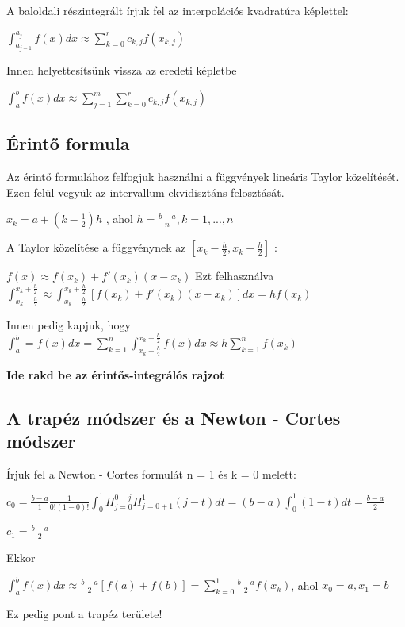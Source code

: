 \documentclass{article}
\theoremstyle{definition}
\begin{document}
A baloldali részintegrált írjuk fel az interpolációs kvadratúra képlettel:
\begin{center}
$\int_{a_{j-1}}^{a_j} f(x) dx \approx \sum_{k=0}^{r} c_{k,j}f(x_{k,j})$
\end{center}

Innen helyettesítsünk vissza az eredeti képletbe
\begin{center}
$\int_a^b f(x) dx \approx \sum_{j=1}^{m} \sum_{k=0}^{r} c_{k,j} f(x_{k,j})$
\end{center}


\subsection{Érintő formula}

Az érintő formulához felfogjuk használni a függvények lineáris Taylor közelítését. Ezen felül vegyük az intervallum ekvidisztáns felosztását.
\begin{center}
   $x_k = a + (k - \frac{1}{2})h$ , ahol $h = \frac{b-a}{n}, k =1,...,n$ 
\end{center}
A Taylor közelítése a függvénynek az $[x_k-\frac{h}{2},x_k+\frac{h}{2}]$ :
\begin{center}
   $f(x) \approx f(x_k)+f'(x_k)(x-x_k)$ 
   Ezt felhasználva
$\int_{x_k - \frac{h}{2}}^{x_k + \frac{h}{2}} \approx \int_{x_k - \frac{h}{2}}^{x_k + \frac{h}{2}} [f(x_k) + f'(x_k)(x-x_k)] dx = hf(x_k)$

Innen pedig kapjuk, hogy
$\int_a^b = f(x) dx = \sum_{k=1}^n \int_{x_k - \frac{h}{2}}^{x_k + \frac{h}{2}} f(x)dx \approx h \sum_{k=1}^n f(x_k)$
\end{center}

\textbf{Ide rakd be az érintős-integrálós rajzot}

\subsection{A trapéz módszer és a Newton - Cortes módszer}
Írjuk fel a Newton - Cortes formulát n = 1 és k = 0 melett:
\begin{center}
$c_0 = \frac{b-a}{1} \frac{1}{0!(1-0)!} \int_0^{1} \Pi_{j=0}^{0-j} \Pi_{j=0+1}^{1} (j-t) dt = (b-a) \int_0^1 (1-t) dt = \frac{b-a}{2}$
\end{center}

\begin{center}
$c_1 = \frac{b-a}{2}$
\end{center}
Ekkor 

\begin{center}
    $\int_a^b f(x) dx \approx \frac{b-a}{2}[f(a) + f(b)] = \sum_{k=0}^{1} \frac{b-a}{2} f(x_k)$, ahol $x_0 = a,x_1=b$
\end{center}
Ez pedig pont a trapéz területe!
\newline
\end{document}
